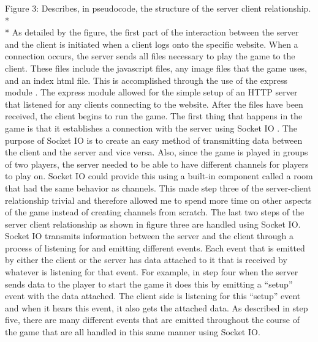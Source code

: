 Figure 3: Describes, in pseudocode, the structure of the server client relationship.
\\*
\\*
As detailed by the figure, the first part of the interaction between the server and the client is initiated when a client logs onto the specific website. When a connection occurs, the server sends all files necessary to play the game to the client.  These files include the javascript files, any image files that the game uses, and an index html file. This is accomplished through the use of the express module \cite{express}. The express module allowed for the simple setup of an HTTP server that listened for any clients connecting to the website. 
After the files have been received, the client begins to run the game. The first thing that happens in the game is that it establishes a connection with the server using Socket IO \cite{socketIO}. The purpose of Socket IO is to create an easy method of transmitting data between the client and the server and vice versa. Also, since the game is played in groups of two players, the server needed to be able to have different channels for players to play on. Socket IO could provide this using a built-in component called a room that had the same behavior as channels. This made step three of the server-client relationship trivial and therefore allowed me to spend more time on other aspects of the game instead of creating channels from scratch.
The last two steps of the server client relationship as shown in figure three are handled using Socket IO. Socket IO transmits information between the server and the client through a process of listening for and emitting different events. Each event that is emitted by either the client or the server has data attached to it that is received by whatever is listening for that event. For example, in step four when the server sends data to the player to start the game it does this by emitting a “setup” event with the data attached. The client side is listening for this “setup” event and when it hears this event, it also gets the attached data. As described in step five, there are many different events that are emitted throughout the course of the game that are all handled in this same manner using Socket IO.